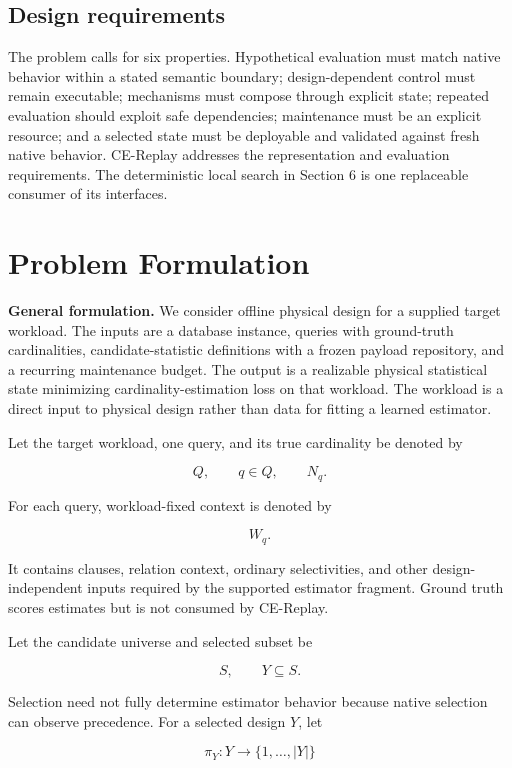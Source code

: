 \documentclass[sigconf,nonacm]{acmart}
\begin{document}
\subsection{Design requirements}

The problem calls for six properties. Hypothetical evaluation must match native behavior within a stated semantic boundary; design-dependent control must remain executable; mechanisms must compose through explicit state; repeated evaluation should exploit safe dependencies; maintenance must be an explicit resource; and a selected state must be deployable and validated against fresh native behavior. CE-Replay addresses the representation and evaluation requirements. The deterministic local search in Section 6 is one replaceable consumer of its interfaces.

\section{Problem Formulation}\label{sec:3}

\textbf{General formulation.} We consider offline physical design for a supplied target workload. The inputs are a database instance, queries with ground-truth cardinalities, candidate-statistic definitions with a frozen payload repository, and a recurring maintenance budget. The output is a realizable physical statistical state minimizing cardinality-estimation loss on that workload. The workload is a direct input to physical design rather than data for fitting a learned estimator.

Let the target workload, one query, and its true cardinality be denoted by

\[
Q, \qquad q \in Q, \qquad N_q.
\]

For each query, workload-fixed context is denoted by

\[
W_q.
\]

It contains clauses, relation context, ordinary selectivities, and other design-independent inputs required by the supported estimator fragment. Ground truth scores estimates but is not consumed by CE-Replay.

Let the candidate universe and selected subset be

\[
S, \qquad Y \subseteq S.
\]

Selection need not fully determine estimator behavior because native selection can observe precedence. For a selected design $Y$, let

\[
\pi_Y:Y\rightarrow\{1,\ldots,|Y|\}
\]
\end{document}
